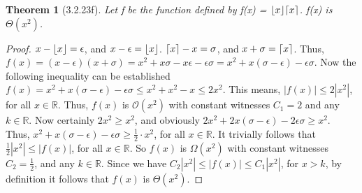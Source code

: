 \documentclass[a4paper, 12pt]{article}
\theoremstyle{plain}
\newtheorem*{theorem*}{Theorem}
\DeclarePairedDelimiter{\floor}{\lfloor}{\rfloor}
\DeclarePairedDelimiter{\ceil}{\lceil}{\rceil}
\begin{document}
	
	\begin{theorem*}[3.2.23f]
		Let f be the function defined by f(x) = $\floor{x} \ceil{x}$. \newline f(x) is $\Theta(x^2)$.
	\end{theorem*}
	
	\begin{proof}
		$x - \floor{x} = \epsilon$, and $x - \epsilon = \floor{x}$. $\ceil{x} - x = \sigma$, and $x + \sigma = \ceil{x}$. Thus, $f(x) = (x - \epsilon)(x + \sigma) = x^2 + x\sigma - x\epsilon - \epsilon \sigma = x^2 + x(\sigma - \epsilon) - \epsilon \sigma$. Now the following inequality can be established $f(x) = x^2 + x(\sigma - \epsilon) - \epsilon \sigma \le x^2 + x^2 - x \le 2x^2$. This means, $|f(x)| \le 2|x^2|$, for all $x \in \mathbb{R}$. Thus, $f(x)$ is $\mathcal{O}(x^2)$ with constant witnesses $C_1 = 2$ and any $k \in \mathbb{R}$. \newline \indent Now certainly $2x^2 \ge x^2$, and obviously $2x^2 + 2x(\sigma - \epsilon) - 2\epsilon \sigma \ge x^2$. Thus, $x^2 + x(\sigma - \epsilon) - \epsilon \sigma \ge \frac{1}{2} \cdot x^2$, for all $x \in \mathbb{R}$. It trivially follows that $\frac{1}{2}|x^2| \le |f(x)|$, for all $x \in \mathbb{R}$. So $f(x)$ is $\Omega(x^2)$ with constant witnesses $C_2 = \frac{1}{2}$, and any $k \in \mathbb{R}$. \newline \indent Since we have $C_2|x^2| \le |f(x)| \le C_1|x^2|$, for $x > k$, by definition it follows that $f(x)$ is $\Theta(x^2)$.
	\end{proof}
\end{document}
